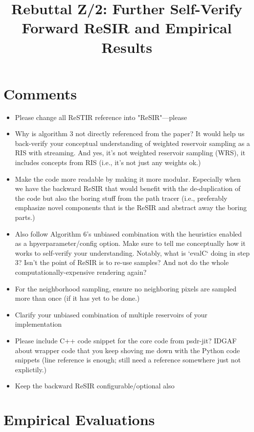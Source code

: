 \title{Rebuttal Z/2: Further Self-Verify Forward ReSIR and Empirical Results}

\maketitle

\section{Comments}

\begin{itemize}
    \item Please change all ReSTIR reference into "ReSIR"---please
    \item Why is algorithm 3 not directly referenced from the paper? It would help us back-verify your conceptual understanding of weighted reservoir sampling as a RIS with streaming. And yes, it's not weighted reservoir sampling (WRS), it includes concepts from RIS (i.e., it's not just any weights ok.)
    \item Make the code more readable by making it more modular. Especially when we have the backward ReSIR that would benefit with the de-duplication of the code but also the boring stuff from the path tracer (i.e., preferably emphasize novel components that is the ReSIR and abstract away the boring parts.)
    \item Also follow Algorithm 6's unbiased combination with the heuristics enabled as a hpyerparameter/config option. Make sure to tell me conceptually how it works to self-verify your understanding. Notably, what is `evalC` doing in step 3? Isn't the point of ReSIR is to re-use samples? And not do the whole computationally-expensive rendering again?
    \item For the neighborhood sampling, ensure no neighboring pixels are sampled more than once (if it has yet to be done.)
    \item Clarify your unbiased combination of multiple reservoirs of your implementation
    \item Please include C++ code snippet for the core code from psdr-jit? IDGAF about wrapper code that you keep shoving me down with the Python code snippets (line reference is enough; still need a reference somewhere just not explictily.)
    \item Keep the backward ReSIR configurable/optional also
\end{itemize}

\section{Empirical Evaluations}

